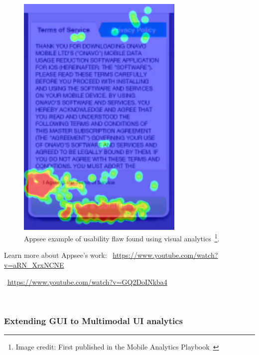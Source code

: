 \begin{figure}[htbp!]
    \begin{minipage}{\textwidth}
    \centering
    \includegraphics[width=8cm]{images/mobile-analytics-playbook/Appsee-Screen-Heatmap.png}
    \caption[Appsee example of usability flaw found using visual analytics]{Appsee example of usability flaw found using visual analytics~\footnote{Image credit: First published in the Mobile Analytics Playbook~\cite{harty_aymer_playbook_2016}}.}
    \label{fig:appsee-example-t-and-c-screen}
    \end{minipage}
\end{figure}

Learn more about Appsee's work: ~\url{https://www.youtube.com/watch?v=aRN_XrxNCNE}

~\url{https://www.youtube.com/watch?v=GQ2DoINkba4}

~\subsubsection{Extending GUI to Multimodal UI analytics}

